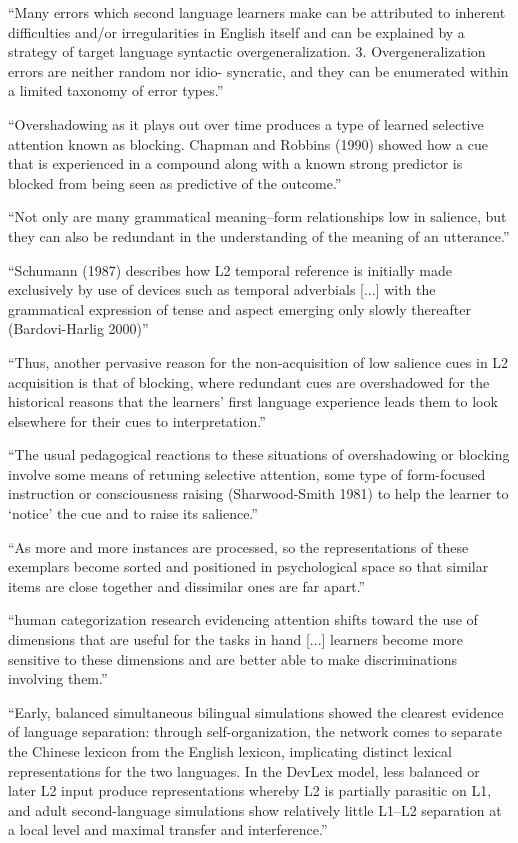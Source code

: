 ``Many errors which second language learners make can be
attributed to inherent difficulties and/or irregularities in English
itself and can be explained by a strategy of target language
syntactic overgeneralization.
3. Overgeneralization errors are neither random nor idio-
syncratic, and they can be enumerated within a limited taxonomy
of error types.''

``Overshadowing as it plays out over time produces a type of learned
selective attention known as blocking. Chapman and Robbins (1990) showed
how a cue that is experienced in a compound along with a known strong
predictor is blocked from being seen as predictive of the outcome.''

``Not only are many grammatical meaning–form relationships low in salience,
but they can also be redundant in the understanding of the meaning of
an utterance.''

``Schumann (1987) describes how L2 temporal reference is initially made exclusively
by use of devices such as temporal adverbials [...] with the grammatical expression of tense and aspect emerging only
slowly thereafter (Bardovi-Harlig 2000)''

``Thus, another pervasive reason for the non-acquisition of low salience cues
in L2 acquisition is that of blocking, where redundant cues are overshadowed
for the historical reasons that the learners’ first language experience leads
them to look elsewhere for their cues to interpretation.''

``The usual pedagogical reactions to these situations of overshadowing or
blocking involve some means of retuning selective attention, some type of
form-focused instruction or consciousness raising (Sharwood-Smith 1981) to
help the learner to ‘notice’ the cue and to raise its salience.''



``As more and more instances are processed,
so the representations of these exemplars become sorted and positioned in
psychological space so that similar items are close together and dissimilar
ones are far apart.''

``human categorization
research evidencing attention shifts toward the use of dimensions that are
useful for the tasks in hand [...] learners
become more sensitive to these dimensions and are better able to make
discriminations involving them.''

``Early, balanced simultaneous bilingual
simulations showed the clearest evidence of language separation: through
self-organization, the network comes to separate the Chinese lexicon from
the English lexicon, implicating distinct lexical representations for the
two languages. In the DevLex model, less balanced or later L2 input
produce representations whereby L2 is partially parasitic on L1, and adult
second-language simulations show relatively little L1–L2 separation at a local
level and maximal transfer and interference.''


